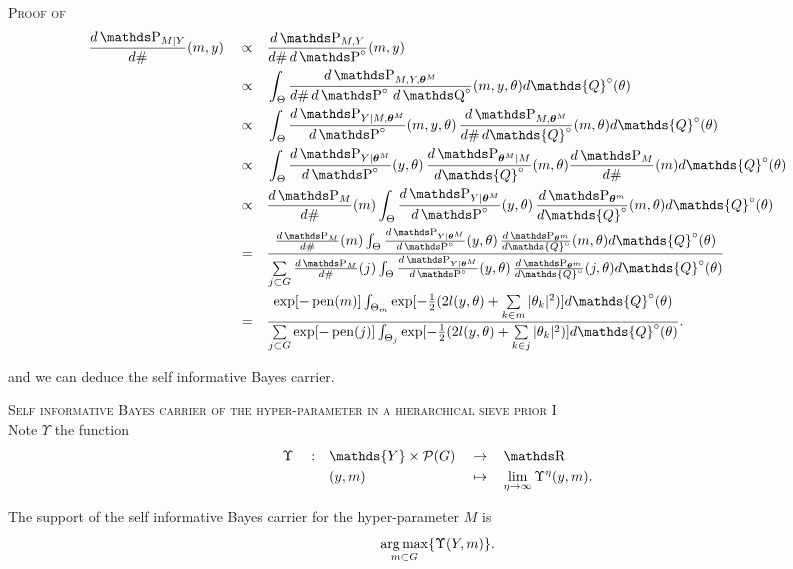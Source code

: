 \begin{pro}{\textsc{Proof of } \\}\label{PRO_BAYES_HIERARCHICAL_ITERATED}
\begin{alignat*}{3}
&\frac{d\P_{M \vert Y}}{d\#}(m, y) &&\propto&& \frac{d\P_{M, Y}}{d\# \, d\P^{\circ}}(m, y)\\
& &&\propto&&\int_{\Theta}\frac{d\P_{M, Y, \boldsymbol{\theta}^{M}}}{d\# \, d\P^{\circ} \, d\Q^{\circ}}(m, y, \theta)d\mathds{Q}^{\circ}(\theta)\\
& &&\propto&&\int_{\Theta}\frac{d\P_{Y \vert M, \boldsymbol{\theta}^{M}}}{d\P^{\circ}}(m, y, \theta) \, \frac{d\P_{M, \boldsymbol{\theta}^{M}}}{d\# \, d\mathds{Q}^{\circ}}(m, \theta)d\mathds{Q}^{\circ}(\theta)\\
& &&\propto&&\int_{\Theta}\frac{d\P_{Y \vert \boldsymbol{\theta}^{M}}}{d\P^{\circ}}(y, \theta) \, \frac{d\P_{\boldsymbol{\theta}^{M}\vert M}}{d\mathds{Q}^{\circ}}(m, \theta) \frac{d\P_{M}}{d\#}(m)d\mathds{Q}^{\circ}(\theta)\\
& &&\propto&&\frac{d\P_{M}}{d\#}(m)\int_{\Theta}\frac{d\P_{Y \vert \boldsymbol{\theta}^{M}}}{d\P^{\circ}}(y, \theta) \, \frac{d\P_{\boldsymbol{\theta}^{m}}}{d\mathds{Q}^{\circ}}(m, \theta) d\mathds{Q}^{\circ}(\theta)\\
& && = && \frac{\frac{d\P_{M}}{d\#}(m)\int_{\Theta}\frac{d\P_{Y \vert \boldsymbol{\theta}^{M}}}{d\P^{\circ}}(y, \theta) \, \frac{d\P_{\boldsymbol{\theta}^{m}}}{d\mathds{Q}^{\circ}}(m, \theta) d\mathds{Q}^{\circ}(\theta)}{\sum\limits_{j \subset G}\frac{d\P_{M}}{d\#}(j)\int_{\Theta}\frac{d\P_{Y \vert \boldsymbol{\theta}^{M}}}{d\P^{\circ}}(y, \theta) \, \frac{d\P_{\boldsymbol{\theta}^{m}}}{d\mathds{Q}^{\circ}}(j, \theta) d\mathds{Q}^{\circ}(\theta)}\\
& && = && \frac{\exp[- \pen(m)] \int_{\Theta_{m}}\exp[-\frac{1}{2}(2 l(y, \theta) + \sum\limits_{k \in m} \vert \theta_{k} \vert^{2})] d\mathds{Q}^{\circ}(\theta)}{\sum\limits_{j \subset G}\exp[- \pen(j)] \int_{\Theta_{j}}\exp[-\frac{1}{2}(2 l(y, \theta) + \sum\limits_{k \in j} \vert \theta_{k} \vert^{2})] d\mathds{Q}^{\circ}(\theta)}.
\end{alignat*}
\qedsymbol
\end{pro}

and we can deduce the self informative Bayes carrier.

\begin{lm}{\textsc{Self informative Bayes carrier of the hyper-parameter in a hierarchical sieve prior I}\\}\label{LM_BAYES_HIERARCHICAL_LIMIT}
Note $\Upsilon$ the function
\begin{alignat*}{5}
& \Upsilon && : && \mathds{Y} \times \mathcal{P}(G) && \rightarrow && \R\\
& && && (y, m) && \mapsto && \lim\limits_{\eta \rightarrow \infty} \Upsilon^{\eta}(y, m).
\end{alignat*}

The support of the self informative Bayes carrier for the hyper-parameter $M$ is
\[\operatorname*{arg\,max}\limits_{m \subset G} \{\Upsilon(Y, m)\}.\]
\end{lm}

